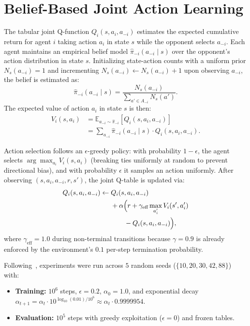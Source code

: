 \section{Belief-Based Joint Action Learning}
The tabular joint Q-function $Q_i(s, a_i, a_{-i})$ estimates the expected cumulative return for agent $i$ taking action $a_i$ in state $s$ while the opponent selects $a_{-i}$. Each agent maintains an empirical belief model $\hat{\pi}_{-i}(a_{-i} \mid s)$ over the opponent's action distribution in state $s$. Initializing state-action counts with a uniform prior $N_s(a_{-i}) = 1$ and incrementing $N_s(a_{-i}) \leftarrow N_s(a_{-i}) + 1$ upon observing $a_{-i}$, the belief is estimated as:
$$
    \hat{\pi}_{-i}(a_{-i} \mid s)
    = \frac{N_s(a_{-i})}{\sum_{a' \in A_{-i}} N_s(a')}.
$$
The expected value of action $a_i$ in state $s$ is then:
$$
    \begin{aligned}
        V_i(s, a_i)
         & = \mathbb{E}_{a_{-i} \sim \hat{\pi}_{-i}}[Q_i(s, a_i, a_{-i})]           \\
         & = \sum_{a_{-i}} \hat{\pi}_{-i}(a_{-i} \mid s) \cdot Q_i(s, a_i, a_{-i}).
    \end{aligned}
$$

Action selection follows an $\epsilon$-greedy policy: with probability $1 - \epsilon$, the agent selects $\arg\max_{a_i} V_i(s, a_i)$ (breaking ties uniformly at random to prevent directional bias), and with probability $\epsilon$ it samples an action uniformly. After observing $(s, a_i, a_{-i}, r, s')$, the joint Q-table is updated via:
$$
    \begin{aligned}
        Q_i(s, a_i, a_{-i}) \leftarrow{} & Q_i(s, a_i, a_{-i})                                              \\
                                         & + \alpha \Bigl(r + \gamma_{\text{eff}} \max_{a_i'} V_i(s', a_i') \\
                                         & \qquad{} - Q_i(s, a_i, a_{-i})\Bigr),
    \end{aligned}
$$
where $\gamma_{\text{eff}} = 1.0$ during non-terminal transitions because $\gamma = 0.9$ is already enforced by the environment's $0.1$ per-step termination probability.

Following~\cite{littman1994markov}, experiments were run across $5$ random seeds ($\{10, 20, 30, 42, 88\}$) with:
\begin{itemize}[noitemsep, topsep=2pt, leftmargin=1.2em]
    \item \textbf{Training:} $10^6$ steps, $\epsilon = 0.2$, $\alpha_0 = 1.0$, and exponential decay $\alpha_{t+1} = \alpha_t \cdot 10^{\log_{10}(0.01)/10^6} \approx \alpha_t \cdot 0.9999954$.
    \item \textbf{Evaluation:} $10^5$ steps with greedy exploitation ($\epsilon = 0$) and frozen tables.
\end{itemize}
